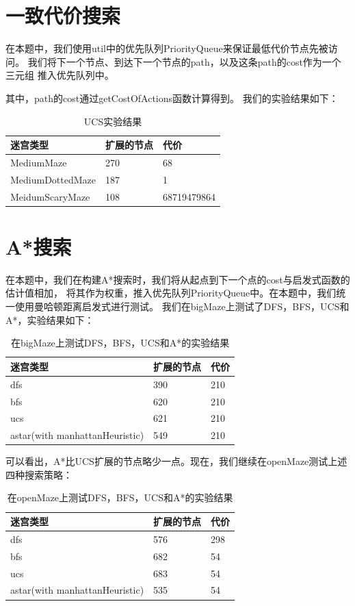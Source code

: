 \documentclass{article}
\begin{document}
\section{一致代价搜索}
在本题中，我们使用util中的优先队列PriorityQueue来保证最低代价节点先被访问。
我们将下一个节点、到达下一个节点的path，以及这条path的cost作为一个三元组
推入优先队列中。

其中，path的cost通过getCostOfActions函数计算得到。
我们的实验结果如下：

\begin{table}[H]
	\centering
	\caption{UCS实验结果}
	\begin{tabular}{lll}
		\hline
	迷宫类型             & 扩展的节点 & 代价          \\
	\hline
	MediumMaze       & 270   & 68          \\
	MediumDottedMaze & 187   & 1           \\
	MeidumScaryMaze  & 108   &  68719479864 \\
	\hline
	\end{tabular}
	\end{table}


\section{A*搜索}
在本题中，我们在构建A*搜索时，我们将从起点到下一个点的cost与启发式函数的估计值相加，
将其作为权重，推入优先队列PriorityQueue中。在本题中，我们统一使用曼哈顿距离启发式进行测试。
我们在bigMaze上测试了DFS，BFS，UCS和A*，实验结果如下：

\begin{table}[H]
	\centering
	\caption{在bigMaze上测试DFS，BFS，UCS和A*的实验结果}
	\begin{tabular}{lll}
		\hline
	迷宫类型                           & 扩展的节点 & 代价  \\
	\hline
	dfs                            & 390   & 210 \\
	bfs                            & 620   & 210 \\
	ucs                            & 621   & 210 \\
	astar(with manhattanHeuristic) & 549   & 210\\ \hline
	\end{tabular}
	\end{table}

	可以看出，A*比UCS扩展的节点略少一点。现在，我们继续在openMaze测试上述四种搜索策略：

	\begin{table}[H]
		\centering
		\caption{在openMaze上测试DFS，BFS，UCS和A*的实验结果}
		\begin{tabular}{lll}
			\hline
		迷宫类型                           & 扩展的节点 & 代价  \\ \hline
		dfs                            & 576   & 298 \\
		bfs                            & 682   & 54  \\
		ucs                            & 683   & 54  \\
		astar(with manhattanHeuristic) & 535   & 54 \\ \hline
		\end{tabular}
		\end{table}
\end{document}
